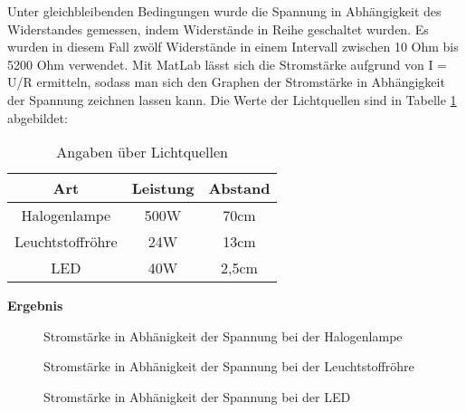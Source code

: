         \par Unter gleichbleibenden Bedingungen wurde die Spannung in Abhängigkeit des Widerstandes gemessen, indem Widerstände in Reihe geschaltet wurden. Es wurden in diesem Fall zwölf Widerstände in einem Intervall zwischen 10 Ohm bis 5200 Ohm verwendet. Mit MatLab lässt sich die Stromstärke aufgrund von I = U/R ermitteln, sodass man sich den Graphen der Stromstärke in Abhängigkeit der Spannung zeichnen lassen kann.
        Die Werte der Lichtquellen sind in Tabelle \ref{tab:Werte} abgebildet:
        \begin{table}[htb]
        	\centering
        	\caption{Angaben über Lichtquellen}
        	\label{tab:Werte}
        	\begin{tabular}{ccc}
        		\toprule
        		Art & Leistung & Abstand \\
        		\midrule
        		Halogenlampe & 500W  & 70cm \\
        		Leuchtstoffröhre & 24W  & 13cm \\
        		LED & 40W & 2,5cm \\
        		\bottomrule
        	\end{tabular}
        \end{table}
        
        \vspace{5mm}
        \textbf{Ergebnis}
        \newline
        
        \begin{figure}[H]
            \def\svgwidth{\textwidth}
            
            
            \caption{Stromstärke in Abhänigkeit der Spannung bei der Halogenlampe}
        \end{figure}
        
        \begin{figure}[H]
            \def\svgwidth{\textwidth}
            
            
            \caption{Stromstärke in Abhänigkeit der Spannung bei der Leuchtstoffröhre}
        \end{figure}
        
        \begin{figure}[H]
            \def\svgwidth{\textwidth}
            
            
            \caption{Stromstärke in Abhänigkeit der Spannung bei der LED}
        \end{figure}

